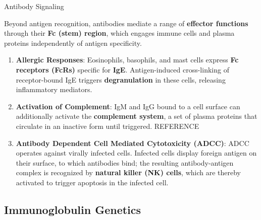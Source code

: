     \begin{core}{Antibody Signaling}

      Beyond antigen recognition, antibodies mediate a range of \textbf{effector functions} through their \textbf{Fc (stem) region}, which engages immune cells and plasma proteins independently of antigen specificity.

      \begin{enumerate}

        \item \textbf{Allergic Responses}: Eosinophils, basophils, and mast cells express \textbf{Fc receptors (FcRs)} specific for \textbf{IgE}. Antigen-induced cross-linking of receptor-bound IgE triggers \textbf{degranulation} in these cells, releasing inflammatory mediators.


        \item \textbf{Activation of Complement}: IgM and IgG bound to a cell surface can additionally activate the \textbf{complement system}, a set of plasma proteins that circulate in an inactive form until triggered. REFERENCE

        \item \textbf{Antibody Dependent Cell Mediated Cytotoxicity (ADCC)}: ADCC operates against virally infected cells. Infected cells display foreign antigen on their surface, to which antibodies bind; the resulting antibody-antigen complex is recognized by \textbf{natural killer (NK) cells}, which are thereby activated to trigger apoptosis in the infected cell.

      \end{enumerate}

    \end{core}

  \subsection{Immunoglobulin Genetics}

